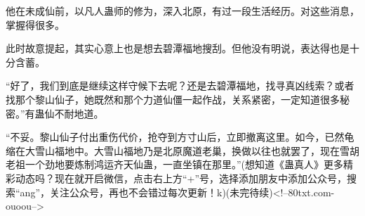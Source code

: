 \begin{this_body}
他在未成仙前，以凡人蛊师的修为，深入北原，有过一段生活经历。对这些消息，掌握得很多。

此时故意提起，其实心意上也是想去碧潭福地搜刮。但他没有明说，表达得也是十分含蓄。

“好了，我们到底是继续这样守候下去呢？还是去碧潭福地，找寻真凶线索？或者找那个黎山仙子，她既然和那个力道仙僵一起作战，关系紧密，一定知道很多秘密。”有蛊仙不耐地道。

“不妥。黎山仙子付出重伤代价，抢夺到方寸山后，立即撤离这里。如今，已然龟缩在大雪山福地中。大雪山福地乃是北原魔道老巢，换做以往也就罢了，现在雪胡老祖一个劲地要炼制鸿运齐天仙蛊，一直坐镇在那里。”(想知道《蛊真人》更多精彩动态吗？现在就开启微信，点击右上方“+”号，选择添加朋友中添加公众号，搜索“ang”，关注公众号，再也不会错过每次更新！k)(未完待续)<!--80txt.com-ouoou-->

\end{this_body}

